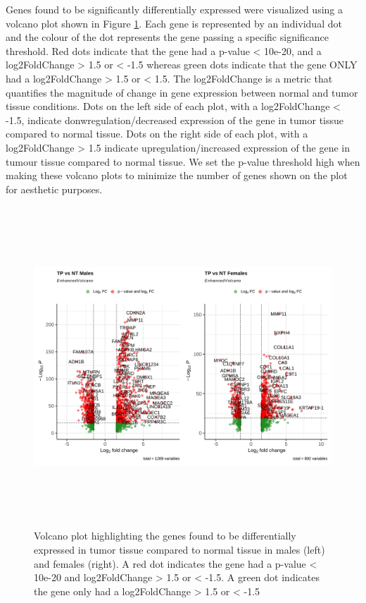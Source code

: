 \documentclass[10pt]{article}
\providecommand{\figref}[1]{Figure \ref{#1}}  %
\begin{document}
	Genes found to be significantly differentially expressed were visualized using a volcano plot shown in \figref{fig:5}. Each gene is represented by an individual dot and the colour of the dot represents the gene passing a specific significance threshold. Red dots indicate that the gene had a p-value < 10e-20, and a log2FoldChange > 1.5 or < -1.5 whereas green dots indicate that the gene ONLY had a log2FoldChange > 1.5 or < 1.5. The log2FoldChange is a metric that quantifies the magnitude of change in gene expression between normal and tumor tissue conditions. Dots on the left side of each plot, with a log2FoldChange < -1.5, indicate donwregulation/decreased expression of the gene in tumor tissue compared to normal tissue. Dots on the right side of each plot, with a log2FoldChange > 1.5 indicate upregulation/increased expression of the gene in tumour tissue compared to normal tissue. We set the p-value threshold high when making these volcano plots to minimize the number of genes shown on the plot for aesthetic purposes.
	
	\begin{figure}[!h]
		\centering
		\includegraphics[width=\textwidth, height=12cm]{all_cancersvolcano_analysis_0.9.png}
		\caption{Volcano plot highlighting the genes found to be differentially expressed in tumor tissue compared to normal tissue in males (left) and females (right). A red dot indicates the gene had a p-value < 10e-20 and log2FoldChange > 1.5 or < -1.5. A green dot indicates the gene only had a log2FoldChange > 1.5 or < -1.5}
		\label{fig:5}
	\end{figure}
\end{document}
